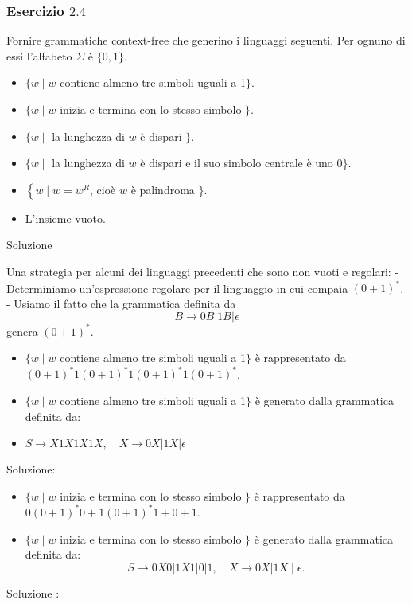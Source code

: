 \subsubsection{Esercizio $2.4$}
Fornire grammatiche context-free che generino i linguaggi seguenti. Per ognuno di essi l'alfabeto $\Sigma$ è $\{0,1\}$.
\begin{itemize}
    \item $\{w \mid w$ contiene almeno tre simboli uguali a 1$\}$.
    \item $\{w \mid w$ inizia e termina con lo stesso simbolo $\}$.
    \item $\{w \mid$ la lunghezza di $w$ è dispari $\} .$
    \item $\{w \mid$ la lunghezza di $w$ è dispari e il suo simbolo centrale è uno 0$\}$.
    \item $\left\{w \mid w=w^{R}\right.$, cioè $w$ è palindroma $\} .$
    \item L'insieme vuoto.
\end{itemize}

Soluzione

Una strategia per alcuni dei linguaggi precedenti che sono non vuoti e regolari:
- Determiniamo un'espressione regolare per il linguaggio in cui compaia $(0+1)^{*}$.
- Usiamo il fatto che la grammatica definita da
$$
B \rightarrow 0 B|1 B| \epsilon
$$
genera $(0+1)^{*}$.
\begin{itemize}
    \item $\{w \mid w$ contiene almeno tre simboli uguali a 1$\}$ è rappresentato da $(0+1)^{*} 1(0+1)^{*} 1(0+1)^{*} 1(0+1)^{*}$.
    \item $\{w \mid w$ contiene almeno tre simboli uguali a 1$\}$ è generato dalla grammatica definita da:
    \item $S \rightarrow X 1 X 1 X 1 X, \quad X \rightarrow 0 X|1 X| \epsilon$
\end{itemize}
Soluzione:

\begin{itemize}
    \item $\{w \mid w$ inizia e termina con lo stesso simbolo $\}$ è rappresentato da $0(0+1)^{*} 0+1(0+1)^{*} 1+0+1$.
    \item $\{w \mid w$ inizia e termina con lo stesso simbolo $\}$ è generato dalla grammatica definita da:
    $$
S \rightarrow 0 X 0|1 X 1| 0|1, \quad X \rightarrow 0 X| 1 X \mid \epsilon .
$$
\end{itemize}

Soluzione :

